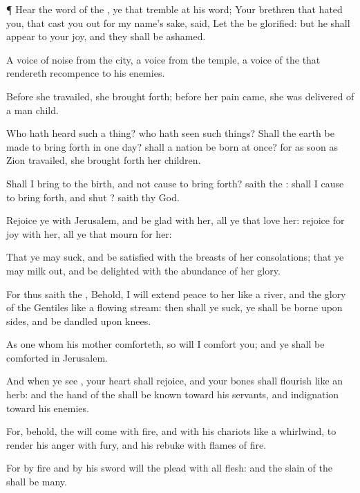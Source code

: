 {\par }{\PP {}¶
Hear the
word of the
{}, ye that
tremble at his
word; Your
brethren that
hated you, that cast you
out for my
name’s sake,
said, Let the
{} be
glorified: but he shall
appear to your
joy, and they shall be
ashamed.

A
voice of
noise from the
city, a
voice from the
temple, a
voice of the
{} that
rendereth
recompence to his
enemies.

Before she
travailed, she brought
forth; before her
pain
came, she was
delivered of a man
child.

Who hath
heard such a thing? who hath
seen such things? Shall the
earth be made to bring
forth in
one
day?
{} shall a
nation be
born at
once? for as soon
as
Zion
travailed, she brought
forth her
children.

Shall I bring to the
birth, and not cause to bring
forth?
saith the
{}: shall
I cause to bring
forth, and
shut
{}?
saith thy
God.

Rejoice ye with
Jerusalem, and be
glad with her, all ye that
love her:
rejoice for
joy with her, all ye that
mourn for her:

That ye may
suck, and be
satisfied with the
breasts of her
consolations; that ye may milk
out, and be
delighted with the
abundance of her
glory.

For thus
saith the
{}, Behold, I will
extend
peace to her like a
river, and the
glory of the
Gentiles like a
flowing
stream: then shall ye
suck, ye shall be
borne upon
{}
sides, and be
dandled upon
{}
knees.

As
one whom his
mother
comforteth, so will I
comfort you; and ye shall be
comforted in
Jerusalem.

And when ye
see
{}, your
heart shall
rejoice, and your
bones shall
flourish like an
herb: and the
hand of the
{} shall be
known toward his
servants, and
{}
indignation toward his
enemies.


\par }{\PP {}For, behold, the
{} will
come with
fire, and with his
chariots like a
whirlwind, to
render his
anger with
fury, and his
rebuke with
flames of
fire.

For by
fire and by his
sword will the
{}
plead with all
flesh: and the
slain of the
{} shall be
many.

}
